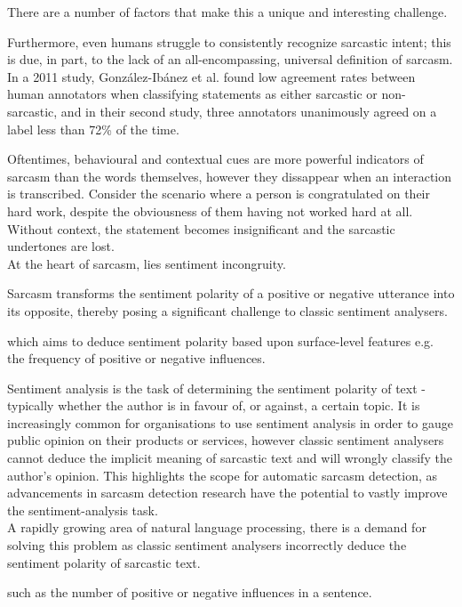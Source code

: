 \documentclass[12pt,a4paper]{article}
\begin{document}
\noindent There are a number of factors that make this a unique and interesting challenge. 

Furthermore, even humans struggle to consistently recognize sarcastic intent; this is due, in part, to the lack of an all-encompassing, universal definition of sarcasm. In a 2011 study, Gonz{\'a}lez-Ib{\'a}nez et al. \cite{gonzalez2011identifying} found low agreement rates between human annotators when classifying statements as either sarcastic or non-sarcastic, and in their second study, three annotators unanimously agreed on a label less than 72\% of the time. 




Oftentimes, behavioural and contextual cues are more powerful indicators of sarcasm than the words themselves, however they dissappear when an interaction is transcribed. Consider the scenario where a person is congratulated on their hard work, despite the obviousness of them having not worked hard at all. Without context, the statement becomes insignificant and the sarcastic undertones are lost.\\

At the heart of sarcasm, lies sentiment incongruity.




Sarcasm transforms the sentiment polarity of a positive or negative utterance into its opposite, thereby posing a significant challenge to classic sentiment analysers. 


 which aims to deduce sentiment polarity based upon surface-level features e.g. the frequency of positive or negative influences.


Sentiment analysis is the task of determining the sentiment polarity of text - typically whether the author is in favour of, or against, a certain topic. It is increasingly common for organisations to use sentiment analysis in order to gauge public opinion on their products or services, however classic sentiment analysers cannot deduce the implicit meaning of sarcastic text and will wrongly classify the author's opinion. This highlights the scope for automatic sarcasm detection, as advancements in sarcasm detection research have the potential to vastly improve the sentiment-analysis task.\\


A rapidly growing area of natural language processing, there is a demand for solving this problem as classic sentiment analysers incorrectly deduce the sentiment polarity of sarcastic text.

such as the number of positive or negative influences in a sentence. 
\end{document}
